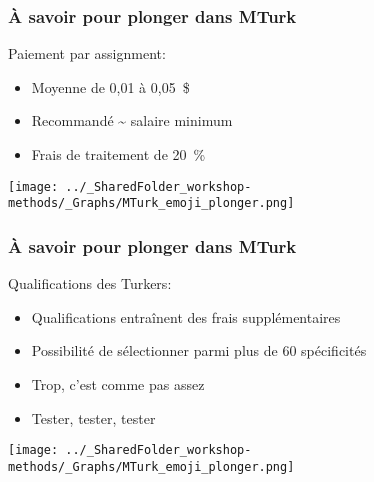 \documentclass{beamer}
\begin{document}
    \begin{frame}
    
      \frametitle{À savoir pour plonger dans MTurk} \vspace{1cm}
      
      Paiement par assignment:
       \begin{itemize}
          \item{Moyenne de 0,01 à 0,05~\$}
          \item{Recommandé \~{} salaire minimum}
          \item{Frais de traitement de 20~\%}
        \end{itemize}
  
   \begin{flushright}
     	    \texttt{[image: ../\_SharedFolder\_workshop-methods/\_Graphs/MTurk\_emoji\_plonger.png]}
    \end{flushright} 
         
    \end{frame}  
    
    

    \begin{frame}
    
      \frametitle{À savoir pour plonger dans MTurk} \vspace{1cm}
      
      Qualifications des Turkers:
       \begin{itemize}
          \item{Qualifications entraînent des frais supplémentaires}
          \item{Possibilité de sélectionner parmi plus de 60 spécificités}
          \item{Trop, c'est comme pas assez}
          \item{Tester, tester, tester}
        \end{itemize}
   
   \begin{flushright}
     	    \texttt{[image: ../\_SharedFolder\_workshop-methods/\_Graphs/MTurk\_emoji\_plonger.png]}
    \end{flushright} 
         
    \end{frame}  
    
\end{document}
